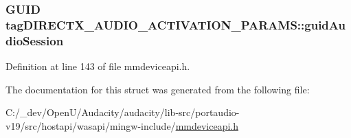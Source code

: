 \subsubsection[{\texorpdfstring{guid\+Audio\+Session}{guidAudioSession}}]{\setlength{\rightskip}{0pt plus 5cm}G\+U\+ID tag\+D\+I\+R\+E\+C\+T\+X\+\_\+\+A\+U\+D\+I\+O\+\_\+\+A\+C\+T\+I\+V\+A\+T\+I\+O\+N\+\_\+\+P\+A\+R\+A\+M\+S\+::guid\+Audio\+Session}\hypertarget{structtag_d_i_r_e_c_t_x___a_u_d_i_o___a_c_t_i_v_a_t_i_o_n___p_a_r_a_m_s_a12516894fa6abccfb8f46b857868e5cf}{}\label{structtag_d_i_r_e_c_t_x___a_u_d_i_o___a_c_t_i_v_a_t_i_o_n___p_a_r_a_m_s_a12516894fa6abccfb8f46b857868e5cf}


Definition at line 143 of file mmdeviceapi.\+h.



The documentation for this struct was generated from the following file\+:\begin{DoxyCompactItemize}
\item 
C\+:/\+\_\+dev/\+Open\+U/\+Audacity/audacity/lib-\/src/portaudio-\/v19/src/hostapi/wasapi/mingw-\/include/\hyperlink{mmdeviceapi_8h}{mmdeviceapi.\+h}\end{DoxyCompactItemize}
